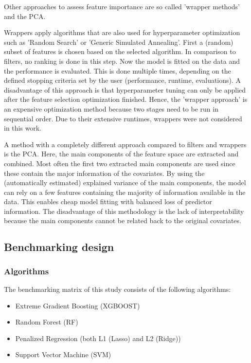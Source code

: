 \documentclass[letterpaper, peerreview]{IEEEtran}
\begin{document}
\noindent Other approaches to assess feature importance are so called 'wrapper methods' and the \ac{PCA}\cite{das2001, jolliffe2016}.

\noindent Wrappers \cite{chandrashekar2014, kohavi1997} apply algorithms that are also used for hyperparameter optimization such as 'Random Search' or 'Generic Simulated Annealing'.
First a (random) subset of features is chosen based on the selected algorithm.
In comparison to filters, no ranking is done in this step.
Now the model is fitted on the data and the performance is evaluated.
This is done multiple times, depending on the defined stopping criteria set by the user (performance, runtime, evaluations).
A disadvantage of this approach is that hyperparameter tuning can only be applied after the feature selection optimization finished.
Hence, the 'wrapper approach' is an expensive optimization method because two stages need to be run in sequential order.
Due to their extensive runtimes, wrappers were not considered in this work.

A method with a completely different approach compared to filters and wrappers is the \ac{PCA}\cite{pearson1901, jolliffe2016}.
Here, the main components of the feature space are extracted and combined.
Most often the first two extracted main components are used since these contain the major information of the covariates.
By using the (automatically estimated) explained variance of the main components, the model can rely on a few features containing the majority of information available in the data.
This enables cheap model fitting with balanced loss of predictor information.
The disadvantage of this methodology is the lack of interpretability because the main components cannot be related back to the original covariates.

\subsection{Benchmarking design}

\subsubsection{Algorithms}

\noindent The benchmarking matrix of this study consists of the following algorithms:

\begin{itemize}
	\item  Extreme Gradient Boosting (XGBOOST)
	\item  Random Forest (RF)
	\item  Penalized Regression (both L1 (Lasso) and L2 (Ridge))
	\item  Support Vector Machine (SVM)
\end{itemize}
\end{document}
